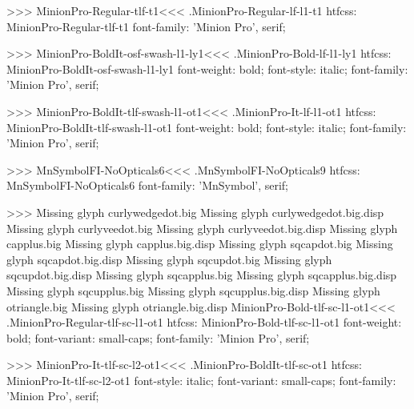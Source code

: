 {>>>
\<MinionPro-Regular-tlf-t1\><<<
.MinionPro-Regular-lf-l1-t1
htfcss:  MinionPro-Regular-tlf-t1  font-family: 'Minion Pro', serif;

>>>
\<MinionPro-BoldIt-osf-swash-l1-ly1\><<<
.MinionPro-Bold-lf-l1-ly1
htfcss:  MinionPro-BoldIt-osf-swash-l1-ly1  font-weight: bold; font-style: italic; font-family: 'Minion Pro', serif;

>>>
\<MinionPro-BoldIt-tlf-swash-l1-ot1\><<<
.MinionPro-It-lf-l1-ot1
htfcss:  MinionPro-BoldIt-tlf-swash-l1-ot1  font-weight: bold; font-style: italic; font-family: 'Minion Pro', serif;

>>>
\<MnSymbolFI-NoOpticals6\><<<
.MnSymbolFI-NoOpticals9
htfcss:  MnSymbolFI-NoOpticals6  font-family: 'MnSymbol', serif;

>>>
Missing glyph	curlywedgedot.big
Missing glyph	curlywedgedot.big.disp
Missing glyph	curlyveedot.big
Missing glyph	curlyveedot.big.disp
Missing glyph	capplus.big
Missing glyph	capplus.big.disp
Missing glyph	sqcapdot.big
Missing glyph	sqcapdot.big.disp
Missing glyph	sqcupdot.big
Missing glyph	sqcupdot.big.disp
Missing glyph	sqcapplus.big
Missing glyph	sqcapplus.big.disp
Missing glyph	sqcupplus.big
Missing glyph	sqcupplus.big.disp
Missing glyph	otriangle.big
Missing glyph	otriangle.big.disp
\<MinionPro-Bold-tlf-sc-l1-ot1\><<<
.MinionPro-Regular-tlf-sc-l1-ot1
htfcss:  MinionPro-Bold-tlf-sc-l1-ot1  font-weight: bold; font-variant: small-caps; font-family: 'Minion Pro', serif;

>>>
\<MinionPro-It-tlf-sc-l2-ot1\><<<
.MinionPro-BoldIt-tlf-sc-ot1
htfcss:  MinionPro-It-tlf-sc-l2-ot1  font-style: italic; font-variant: small-caps; font-family: 'Minion Pro', serif;

}
